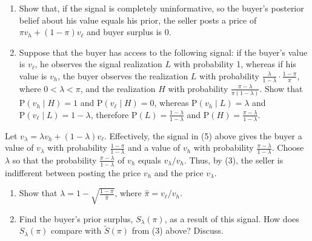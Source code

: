 \documentclass[11pt,english]{article}
\begin{document}
\begin{enumerate}
    \item[(4)] Show that, if the signal is completely uninformative, so the
        buyer's posterior belief about his value equals his prior, the seller
        posts a price of $\pi v_h + (1-\pi)v_\ell$ and buyer surplus is 0.
    \begin{solution}
 
    \end{solution}
 
    \item[(5)] Suppose that the buyer has access to the following signal: if
        the buyer's value is $v_\ell$, he observes the signal realization $L$
        with probability 1, whereas if his value is $v_h$, the buyer observes
        the realization $L$ with probability $\frac{\lambda}{1-\lambda} \cdot
        \frac{1-\pi}{\pi}$, where $0 < \lambda < \pi$, and the realization $H$
        with probability $\frac{\pi - \lambda}{\pi(1-\lambda)}$. Show that
        $\mathrm{P}(v_h \mid H) = 1$ and $\mathrm{P}(v_\ell \mid H) = 0$,
        whereas $\mathrm{P}(v_h \mid L) = \lambda$ and $\mathrm{P}(v_\ell
        \mid L) = 1 - \lambda$, therefore $\mathrm{P}(L) = \frac{1-\lambda}
        {1-\lambda}$ and $\mathrm{P}(H) = \frac{\pi - \lambda}{1 - \lambda}$.
    \begin{solution}
 
    \end{solution}
\end{enumerate}
 
Let $v_\lambda = \lambda v_h + (1-\lambda)v_\ell$. Effectively, the signal in
(5) above gives the buyer a value of $v_\lambda$ with probability
$\frac{1-\pi}{1-\lambda}$ and a value of $v_h$ with probability $\frac{\pi -
\lambda}{1-\lambda}$. Choose $\lambda$ so that the probability $\frac{\pi -
\lambda}{1-\lambda}$ of $v_h$ equals $v_\lambda / v_h$. Thus, by (3), the
seller is indifferent between posting the price $v_h$ and the price
$v_\lambda$.
 
\begin{enumerate}
    \item[(6)] Show that $\lambda = 1 - \sqrt{\frac{1-\pi}{\hat{\pi}}}$, where
        $\hat{\pi} = v_\ell / v_h$.
    \begin{solution}
 
    \end{solution}
 
    \item[(7)] Find the buyer's prior surplus, $S_\lambda(\pi)$, as a result of
        this signal. How does $S_\lambda(\pi)$ compare with $\tilde{S}(\pi)$
        from (3) above? Discuss.
    \begin{solution}
 
    \end{solution}
\end{enumerate}
\end{document}

